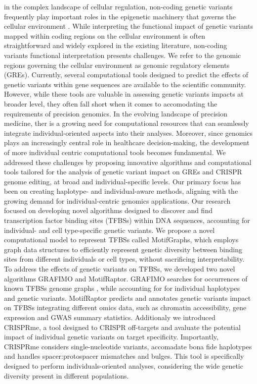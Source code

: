 \documentclass[a4paper, titlepage, openright]{book}
\newcommand{\grafimo}{GRAFIMO\xspace}
\newcommand{\crisprme}{CRISPRme\xspace}
\newcommand{\motifraptor}{MotifRaptor\xspace}
\begin{document}
in the complex landscape of cellular regulation, non-coding genetic variants frequently play important roles in the epigenetic machinery that governs the cellular environment \citep{maurano2012systematic}. While interpreting the functional impact of genetic variants mapped within coding regions on the cellular environment is often straightforward and widely explored in the existing literature, non-coding variants functional interpretation presents challenges.  We refer to the genomic regions governing the cellular environment as genomic regulatory elements (GREs). Currently, several computational tools designed to predict the effects of genetic variants within gene sequences are available to the scientific community.  However,  while these tools are valuable in assessing genetic variants impacts at broader level, they often fall short when it comes to accomodating the requirements of precision genomics.  In the evolving landscape of precision medicine, ther is a growing need for computational resources that can seamlessly  integrate individual-oriented aspects into their analyses.  Moreover, since genomics plays an increasingly central role in healthcare decision-making, the development of more individual centric computational tools becomes fundamental. We addressed these challenges by proposing innovative algorithms and computational tools tailored for the analysis of genetic variant impact on GREs and CRISPR genome editing, at broad and individual-specific levels. Our primary focus has been on creating haplotype- and individual-aware methods, aligning with the growing demand for individual-centric genomics applications.  Our research focused on developing novel algorithms designed to discover and find transcription factor binding sites (TFBSs) within DNA sequences, accounting for individual- and cell type-specific genetic variants.  We propose a novel computational model to represent TFBSs called MotifGraphs, which employs graph data structures to efficiently represent genetic diversity between binding sites from different individuals or cell types, without sacrificing interpretability.  To address the effects of genetic variants on TFBSs, we developed two novel algorithms \grafimo \citep{tognon2021grafimo} and \motifraptor \citep{yao2021motif}. \grafimo searches for occurrences of known TFBSs genome graphs \citep{paten2017genome}, while accounting for for individual haplotypes and genetic variants. \motifraptor predicts and annotates genetic variants impact on TFBSs integrating different omics data, such as chromatin accessibility, gene expression and GWAS summary statistics. Additionaly we introduced \crisprme \citep{cancellieri2023human}, a tool designed to CRISPR off-targets and avaluate the potential impact of individual genetic variants on target specificity.  Importantly,  \crisprme considers single-nucleotide variants, accomadate bona fide haplotypes and handles spacer:protospacer mismatches and bulges. This tool is specifically designed to perform individuals-oriented analyses, considering the wide genetic diversity present in different populations.
\end{document}
